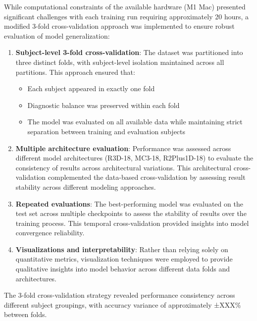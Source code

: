 \documentclass[12pt, a4paper]{article}
\begin{document}
While computational constraints of the available hardware (M1 Mac) presented significant challenges with each training run requiring approximately 20 hours, a modified 3-fold cross-validation approach was implemented to ensure robust evaluation of model generalization:

\begin{enumerate}
    \item \textbf{Subject-level 3-fold cross-validation}: The dataset was partitioned into three distinct folds, with subject-level isolation maintained across all partitions. This approach ensured that:
    \begin{itemize}
        \item Each subject appeared in exactly one fold
        \item Diagnostic balance was preserved within each fold 
        \item The model was evaluated on all available data while maintaining strict separation between training and evaluation subjects
    \end{itemize}
    
    \item \textbf{Multiple architecture evaluation}: Performance was assessed across different model architectures (R3D-18, MC3-18, R2Plus1D-18) to evaluate the consistency of results across architectural variations. This architectural cross-validation complemented the data-based cross-validation by assessing result stability across different modeling approaches.
    
    \item \textbf{Repeated evaluations}: The best-performing model was evaluated on the test set across multiple checkpoints to assess the stability of results over the training process. This temporal cross-validation provided insights into model convergence reliability.
    
    \item \textbf{Visualizations and interpretability}: Rather than relying solely on quantitative metrics, visualization techniques were employed to provide qualitative insights into model behavior across different data folds and architectures.
\end{enumerate}

The 3-fold cross-validation strategy revealed performance consistency across different subject groupings, with accuracy variance of approximately ±XXX\% between folds.
\end{document}
